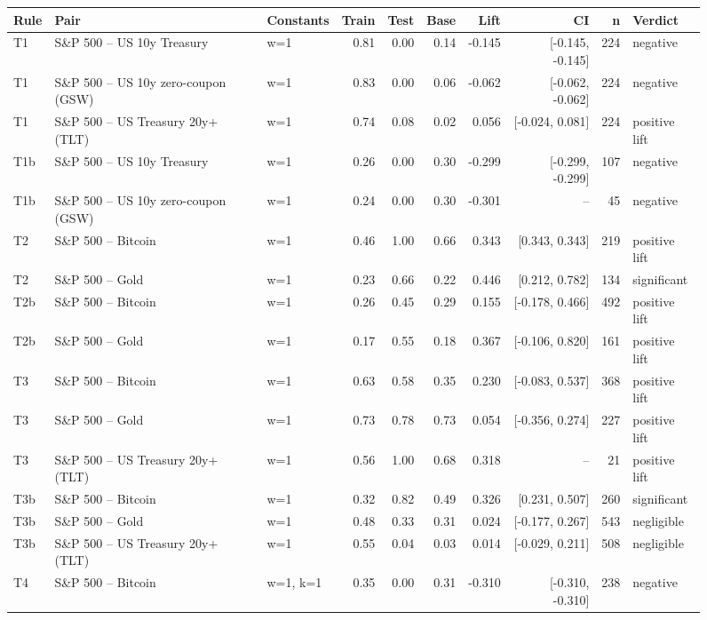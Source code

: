 \begin{figure}
\centering
\begin{tabular}{lllrrrrrrl}
\toprule
Rule & Pair & Constants & Train & Test & Base & Lift & CI & n & Verdict \\
\midrule
T1 & S\&P 500 -- US 10y Treasury & w=1 & 0.81 & 0.00 & 0.14 & -0.145 & [-0.145, -0.145] & 224 & negative \\
T1 & S\&P 500 -- US 10y zero-coupon (GSW) & w=1 & 0.83 & 0.00 & 0.06 & -0.062 & [-0.062, -0.062] & 224 & negative \\
T1 & S\&P 500 -- US Treasury 20y+ (TLT) & w=1 & 0.74 & 0.08 & 0.02 & 0.056 & [-0.024, 0.081] & 224 & positive lift \\
T1b & S\&P 500 -- US 10y Treasury & w=1 & 0.26 & 0.00 & 0.30 & -0.299 & [-0.299, -0.299] & 107 & negative \\
T1b & S\&P 500 -- US 10y zero-coupon (GSW) & w=1 & 0.24 & 0.00 & 0.30 & -0.301 & -- & 45 & negative \\
T2 & S\&P 500 -- Bitcoin & w=1 & 0.46 & 1.00 & 0.66 & 0.343 & [0.343, 0.343] & 219 & positive lift \\
T2 & S\&P 500 -- Gold & w=1 & 0.23 & 0.66 & 0.22 & 0.446 & [0.212, 0.782] & 134 & significant \\
T2b & S\&P 500 -- Bitcoin & w=1 & 0.26 & 0.45 & 0.29 & 0.155 & [-0.178, 0.466] & 492 & positive lift \\
T2b & S\&P 500 -- Gold & w=1 & 0.17 & 0.55 & 0.18 & 0.367 & [-0.106, 0.820] & 161 & positive lift \\
T3 & S\&P 500 -- Bitcoin & w=1 & 0.63 & 0.58 & 0.35 & 0.230 & [-0.083, 0.537] & 368 & positive lift \\
T3 & S\&P 500 -- Gold & w=1 & 0.73 & 0.78 & 0.73 & 0.054 & [-0.356, 0.274] & 227 & positive lift \\
T3 & S\&P 500 -- US Treasury 20y+ (TLT) & w=1 & 0.56 & 1.00 & 0.68 & 0.318 & -- & 21 & positive lift \\
T3b & S\&P 500 -- Bitcoin & w=1 & 0.32 & 0.82 & 0.49 & 0.326 & [0.231, 0.507] & 260 & significant \\
T3b & S\&P 500 -- Gold & w=1 & 0.48 & 0.33 & 0.31 & 0.024 & [-0.177, 0.267] & 543 & negligible \\
T3b & S\&P 500 -- US Treasury 20y+ (TLT) & w=1 & 0.55 & 0.04 & 0.03 & 0.014 & [-0.029, 0.211] & 508 & negligible \\
T4 & S\&P 500 -- Bitcoin & w=1, k=1 & 0.35 & 0.00 & 0.31 & -0.310 & [-0.310, -0.310] & 238 & negative \\

\end{tabular}
\end{figure}
